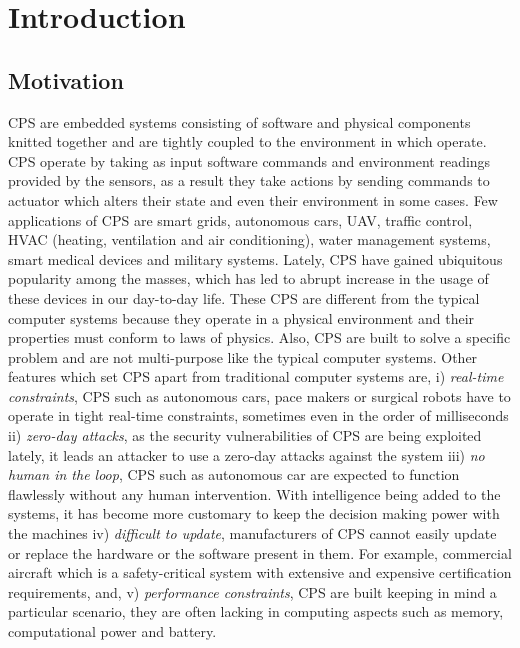 
\chapter{Introduction}
\label{ch:Introduction}

\section{Motivation}
\label{sec:Motivation}

\ac{CPS} are embedded systems consisting of software and physical components knitted together and are tightly coupled to the environment in which operate. \ac{CPS} operate by taking as input software commands and environment readings provided by the sensors, as a result they take actions by sending commands to actuator which alters their state and even their environment in some cases. Few applications of \ac{CPS} are smart grids\cite{karnouskos2011cyber, ericsson2010cyber}, autonomous cars\cite{checkoway2011comprehensive, yang2014vehicle}, \ac{UAV}\cite{javaid2012cyber, mohammed2014uavs}, traffic control, HVAC (heating, ventilation and air conditioning), water management systems, smart medical devices and military systems. Lately, CPS have gained ubiquitous popularity among the masses, which has led to abrupt increase in the usage of these devices in our day-to-day life. These \ac{CPS} are different from the typical computer systems because they operate in a physical environment and their properties must conform to laws of physics. Also, \ac{CPS} are built to solve a specific problem and are not multi-purpose like the typical computer systems. Other features which set \ac{CPS} apart from traditional computer systems are, i) \textit{real-time constraints}, \ac{CPS} such as autonomous cars, pace makers or surgical robots have to operate in tight real-time constraints, sometimes even in the order of milliseconds ii) \textit{zero-day attacks}, as the security vulnerabilities of \ac{CPS} are being exploited lately, it leads an attacker to use a zero-day attacks against the system iii) \textit{no human in the loop}, \ac{CPS} such as autonomous car are expected to function flawlessly without any human intervention. With intelligence being added to the systems, it has become more customary to keep the decision making power with the machines  iv) \textit{difficult to update}, manufacturers of \ac{CPS} cannot easily update or replace the hardware or the software present in them. For example, commercial aircraft which is a safety-critical system with extensive and expensive certification requirements, and, v) \textit{performance constraints}, \ac{CPS} are built keeping in mind a particular scenario, they are often lacking in computing aspects such as memory, computational power and battery.

